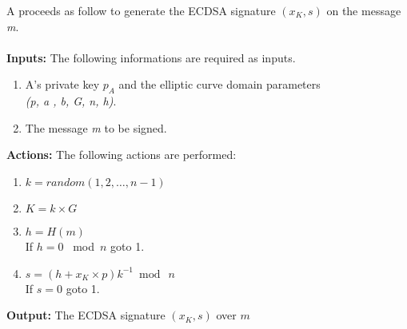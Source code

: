 A proceeds as follow to generate the ECDSA signature $(x_{K}, s)$ on the message \textit{m}.\\
\\
\textbf{Inputs:} The following informations are required as inputs.

\hspace{1.1cm}
\begin{minipage}[l]{2\linewidth}
	\begin{enumerate}
		\item A's private key  \textit{$p_{A}$} and the elliptic curve domain parameters\\ \textit{(p, a , b, G, n, h)}.
		\item The message \textit{m} to be signed.\\
	\end{enumerate}
\end{minipage}


\textbf{Actions:} The following actions are performed:

\hspace{1.2cm}
\begin{minipage}[l]{2\linewidth}
	\begin{enumerate}
		\item $\textit{k}=random({1, 2, \dots, n-1})$
		\item $K=k \times G$
		\item $h=H(m)$\\
		If $h=0$ \ mod\ $n$ goto 1.
		\item $s=(h+x_{K}\times p)k^{-1}\bmod\ n$ \\
		If $s=0$ goto 1.
	\end{enumerate}
\end{minipage}

\textbf{Output:} The ECDSA signature $(x_{K}, s)$ over $m$


